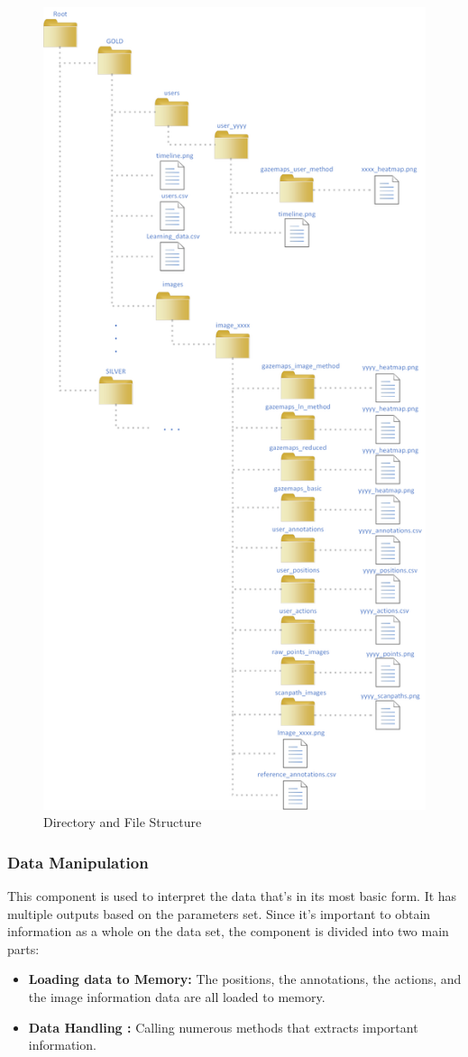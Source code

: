 \documentclass[a4paper,11pt]{report}
\numberwithin{figure}{section} %
\begin{document}
       \begin{figure}[H]
        \centering
         \includegraphics[width=.6\linewidth]{diagrams/directories.png}
         \caption{Directory and File Structure}
         \label{fig:struct}
       \end{figure}
        
	\subsubsection{Data Manipulation}
    
    This component is used to interpret the data that's in its most basic form.
    It has multiple outputs based on the parameters set.
    Since it's important to obtain information as a whole on the data set, the component is divided into two main parts:
    \begin{itemize}
        \item[\textbullet] \textbf{Loading data to Memory:} The positions, the annotations, the actions, and the image information data are all loaded to memory.
        \item[\textbullet] \textbf{Data Handling :} Calling numerous methods that extracts important information.
    \end{itemize}
\end{document}
